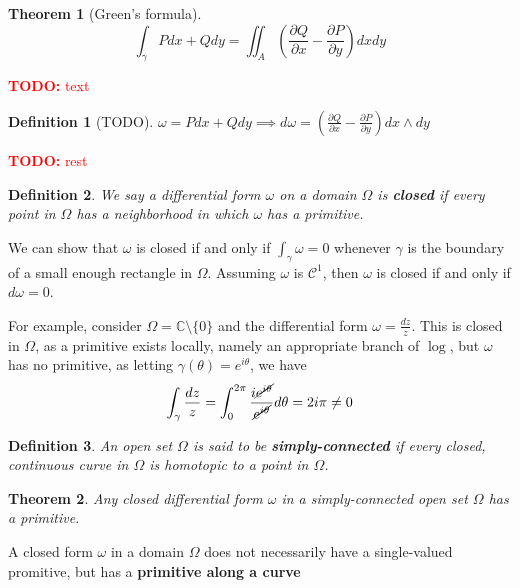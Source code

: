 \documentclass{article}
\newtheorem{theorem}{Theorem}
\newcommand{\mbb}[1]{\mathbb{#1}}
\newcommand{\mc}[1]{\mathcal{#1}}
\newcommand{\prt}[2]{{\frac{\partial {#1}}{\partial {#2}}}}
\newtheorem{definition}{Definition}
\newcommand{\TODO}[1]{\begin{center}\huge{\textcolor{red}{\textbf{TODO:} #1}}\end{center}}
\begin{document}
\begin{theorem}[Green's formula]
\begin{equation}\int_\gamma Pdx + Qdy = \iint_A\left(\prt{Q}{x} - \prt{P}{y}\right)dxdy\end{equation}
\end{theorem}

\TODO{text}

\begin{definition}[TODO]
\(\omega = Pdx + Qdy \implies d\omega = \left(\prt{Q}{x} - \prt{P}{y}\right)dx \wedge dy\)
\end{definition}

\TODO{rest}

\begin{definition}
We say a differential form \(\omega\) on a domain \(\Omega\) is \textbf{closed} if every point in \(\Omega\) has a neighborhood in which \(\omega\) has a primitive.
\end{definition}

We can show that \(\omega\) is closed if and only if \(\int_\gamma\omega = 0\) whenever \(\gamma\) is the boundary of a small enough rectangle in \(\Omega\).
Assuming \(\omega\) is \(\mc{C}^1\), then \(\omega\) is closed if and only if \(d\omega = 0\).

For example, consider \(\Omega = \mbb{C} \setminus \{0\}\) and the differential form \(\omega = \frac{dz}{z}\). This is closed in \(\Omega\), as a primitive exists locally, namely an appropriate branch of \(\log\), but \(\omega\) has no primitive, as letting \(\gamma(\theta) = e^{i\theta}\), we have
\begin{equation}
  \int_\gamma\frac{dz}{z} = \int_0^{2\pi}\frac{i\cancel{e^{i\theta}}}{\cancel{e^{i\theta}}}d\theta
  = 2i\pi \neq 0
\end{equation}

\begin{definition}
An open set \(\Omega\) is said to be \textbf{simply-connected} if every closed, continuous curve in \(\Omega\) is homotopic to a point in \(\Omega\).
\end{definition}

\begin{theorem}
Any closed differential form \(\omega\) in a simply-connected open set \(\Omega\) has a primitive.
\end{theorem}

A closed form \(\omega\) in a domain \(\Omega\) does not necessarily have a single-valued promitive, but has a \textbf{primitive along a curve}
\end{document}
